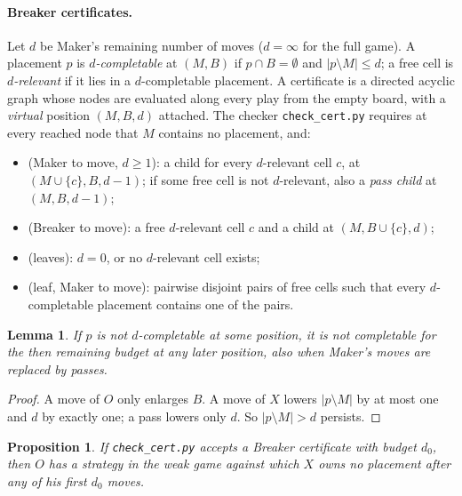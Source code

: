 \documentclass[11pt]{article}
\newtheorem{lemma}[theorem]{Lemma}
\newtheorem{proposition}[theorem]{Proposition}
\theoremstyle{definition}
\theoremstyle{remark}
\newcommand{\file}[1]{\texttt{#1}}
\begin{document}
\paragraph{Breaker certificates.} Let $d$ be Maker's remaining number of moves ($d=\infty$ for the
full game). A placement $p$ is \emph{$d$-completable} at $(M,B)$ if $p\cap B=\emptyset$ and
$|p\setminus M|\le d$; a free cell is \emph{$d$-relevant} if it lies in a $d$-completable
placement. A certificate is a directed acyclic graph whose nodes are evaluated along every play from
the empty board, with a \emph{virtual} position $(M,B,d)$ attached. The checker
\file{check\_cert.py} requires at every reached node that $M$ contains no placement, and:
\begin{itemize}
\item[\texttt{m}] (Maker to move, $d\ge 1$): a child for every $d$-relevant cell $c$, at
$(M\cup\{c\},B,d-1)$; if some free cell is not $d$-relevant, also a \emph{pass child} at
$(M,B,d-1)$;
\item[\texttt{b}] (Breaker to move): a free $d$-relevant cell $c$ and a child at $(M,B\cup\{c\},d)$;
\item[\texttt{Z}, \texttt{D}] (leaves): $d=0$, or no $d$-relevant cell exists;
\item[\texttt{P}] (leaf, Maker to move): pairwise disjoint pairs of free cells such that every
$d$-completable placement contains one of the pairs.
\end{itemize}

\begin{lemma}\label{lem:perm}
If $p$ is not $d$-completable at some position, it is not completable for the then remaining budget
at any later position, also when Maker's moves are replaced by passes.
\end{lemma}

\begin{proof}
A move of $O$ only enlarges $B$. A move of $X$ lowers $|p\setminus M|$ by at most one and $d$ by
exactly one; a pass lowers only $d$. So $|p\setminus M|>d$ persists.
\end{proof}

\begin{proposition}\label{prop:breaker}
If \file{check\_cert.py} accepts a Breaker certificate with budget $d_0$, then $O$ has a strategy in
the weak game against which $X$ owns no placement after any of his first $d_0$ moves.
\end{proposition}
\end{document}

